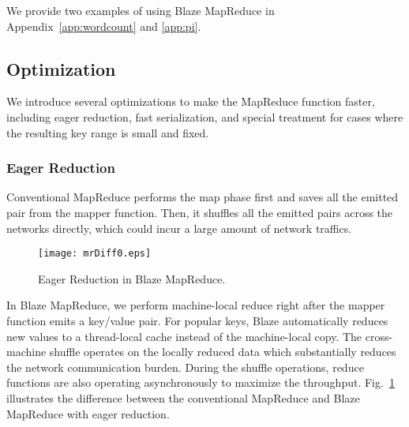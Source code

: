 We provide two examples of using Blaze MapReduce in Appendix~\ref{app:wordcount} and \ref{app:pi}.

\subsection{Optimization}
\label{sec:opt}
We introduce several optimizations to make the MapReduce function faster, including eager reduction, fast serialization, and special treatment for cases where the resulting key range is small and fixed.

\subsubsection{Eager Reduction}

Conventional MapReduce performs the map phase first and saves all the emitted pair from the mapper function.
Then, it shuffles all the emitted pairs across the networks directly, which could incur a large amount of network traffics.

\begin{figure}
  \begin{center}
  \texttt{[image: mrDiff0.eps]}
  \end{center}
  \vspace{-0.2cm}
  \caption{Eager Reduction in Blaze MapReduce.
  }
  \label{fig:mrdiff}
\end{figure}

In Blaze MapReduce, we perform machine-local reduce right after the mapper function emits a key/value pair.
For popular keys, Blaze automatically reduces new values to a thread-local cache instead of the machine-local copy.
The cross-machine shuffle operates on the locally reduced data which substantially reduces the network communication burden.
During the shuffle operations, reduce functions are also operating asynchronously to maximize the throughput.
Fig.~\ref{fig:mrdiff} illustrates the difference between the conventional MapReduce and Blaze MapReduce with eager reduction.

